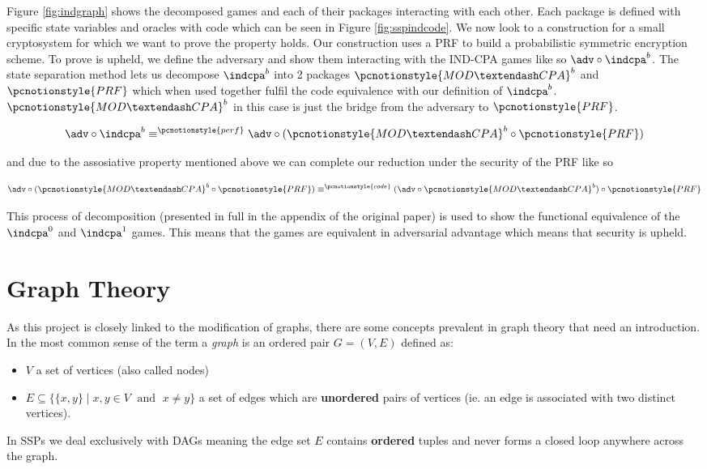 \documentclass[bsc,frontabs,singlespacing,parskip,deptreport]{infthesis}
\begin{document}
{}


Figure \ref{fig:indgraph} shows the decomposed games and each of their packages interacting with each other. Each package is defined with specific state variables and oracles with code which can be seen in Figure \ref{fig:sspindcode}. We now look to a construction for a small cryptosystem for which we want to prove the {\indcpa} property holds. Our construction uses a PRF to build a probabilistic symmetric encryption scheme. To prove {\indcpa} is upheld, we define the adversary and show them interacting with the IND-CPA games like so $\adv\circ\indcpa^b$. The state separation method lets us decompose $\indcpa^b$ into 2 packages $\pcnotionstyle{MOD\textendash CPA}^b$ and $\pcnotionstyle{PRF}$ which when used together fulfil the code equivalence with our definition of $\indcpa^b$. $\pcnotionstyle{MOD\textendash CPA}^b$ in this case is just the bridge from the adversary to $\pcnotionstyle{PRF}$.

$$\adv\circ\indcpa^b \equiv^{\tiny\pcnotionstyle{perf}} \adv\circ(\pcnotionstyle{MOD\textendash CPA}^b \circ \pcnotionstyle{PRF})$$ 

and due to the assosiative property mentioned above we can complete our reduction under the security of the PRF like so 

$$\adv\circ(\pcnotionstyle{MOD\textendash CPA}^b \circ \pcnotionstyle{PRF}) \equiv^{\tiny\pcnotionstyle{code}} (\adv\circ\pcnotionstyle{MOD\textendash CPA}^b) \circ \pcnotionstyle{PRF}$$ 

This process of decomposition (presented in full in the appendix of the original paper\cite{ssp}) is used to show the functional equivalence of the $\indcpa^0$ and $\indcpa^1$ games. This means that the games are equivalent in adversarial advantage which means that {\indcpa} security is upheld.  

\section{Graph Theory}
As this project is closely linked to the modification of graphs, there are some concepts prevalent in graph theory that need an introduction. In the most common sense of the term a \textit{graph} is an ordered pair $G=(V,E)$ defined as:
\begin{itemize}
    \item $V$ a set of vertices (also called nodes)
    \item$E \subseteq \{ \{x, y\} \mid x, y \in V \;\textrm{ and }\; x \neq y \}$ a set of edges which are \textbf{unordered} pairs of vertices (ie. an edge is associated with two distinct vertices).
\end{itemize}
In SSPs we deal exclusively with DAGs meaning the edge set $E$ contains \textbf{ordered} tuples and never forms a closed loop anywhere across the graph.  
\end{document}
